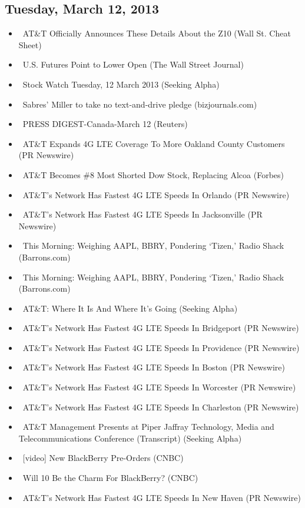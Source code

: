 \documentclass[11pt,asymmetric]{article}
\begin{document}
\subsection*{Tuesday, March 12, 2013}
\begin{itemize}
\item\ AT\&T Officially Announces These Details About the Z10 (Wall St. Cheat Sheet)
\item\ U.S. Futures Point to Lower Open (The Wall Street Journal)
\item\ Stock Watch Tuesday, 12 March 2013 (Seeking Alpha)
\item\ Sabres' Miller to take no text-and-drive pledge (bizjournals.com)
\item\ PRESS DIGEST-Canada-March 12 (Reuters)
\item\ AT\&T Expands 4G LTE Coverage To More Oakland County Customers (PR Newswire)
\item\ AT\&T Becomes \#8 Most Shorted Dow Stock, Replacing Alcoa (Forbes)
\item\ AT\&T's Network Has Fastest 4G LTE Speeds In Orlando (PR Newswire)
\item\ AT\&T's Network Has Fastest 4G LTE Speeds In Jacksonville (PR Newswire)
\item\ This Morning: Weighing AAPL, BBRY, Pondering `Tizen,' Radio Shack (Barrons.com)
\item\ This Morning: Weighing AAPL, BBRY, Pondering `Tizen,' Radio Shack (Barrons.com)
\item\ AT\&T: Where It Is And Where It's Going (Seeking Alpha)
\item\ AT\&T's Network Has Fastest 4G LTE Speeds In Bridgeport (PR Newswire)
\item\ AT\&T's Network Has Fastest 4G LTE Speeds In Providence (PR Newswire)
\item\ AT\&T's Network Has Fastest 4G LTE Speeds In Boston (PR Newswire)
\item\ AT\&T's Network Has Fastest 4G LTE Speeds In Worcester (PR Newswire)
\item\ AT\&T's Network Has Fastest 4G LTE Speeds In Charleston (PR Newswire)
\item\ AT\&T Management Presents at Piper Jaffray Technology, Media and Telecommunications Conference (Transcript) (Seeking Alpha)
\item\ [video] New BlackBerry Pre-Orders (CNBC)
\item\ Will 10 Be the Charm For BlackBerry? (CNBC)
\item\ AT\&T's Network Has Fastest 4G LTE Speeds In New Haven (PR Newswire)

\end{itemize}
\end{document}
